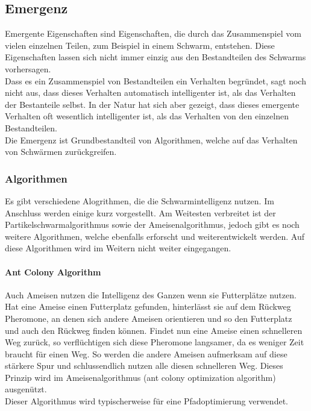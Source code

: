 		\subsection{Emergenz}
		Emergente Eigenschaften sind Eigenschaften, die durch das Zusammenspiel vom vielen einzelnen Teilen, zum Beispiel in einem Schwarm, entstehen. Diese Eigenschaften lassen sich nicht immer einzig aus den Bestandteilen des Schwarms vorhersagen. \\
		Dass es ein Zusammenspiel von Bestandteilen ein Verhalten begründet, sagt noch nicht aus, dass dieses Verhalten automatisch intelligenter ist, als das Verhalten der Bestanteile selbst. In der Natur hat sich aber gezeigt, dass dieses emergente Verhalten oft wesentlich intelligenter ist, als das Verhalten von den einzelnen Bestandteilen. \\
		Die Emergenz ist Grundbestandteil von Algorithmen, welche auf das Verhalten von Schwärmen zurückgreifen.\cite{melchior-bsc}
		
		
				
		\subsubsection{Algorithmen}
		Es gibt verschiedene Alogrithmen, die die Schwarmintelligenz nutzen. Im Anschluss werden einige kurz vorgestellt. Am Weitesten verbreitet ist der Partikelschwarmalgorithmus sowie der Ameisenalgorithmus, jedoch gibt es noch weitere Algorithmen, welche ebenfalls erforscht und weiterentwickelt werden. Auf diese Algorithmen wird im Weitern nicht weiter eingegangen.\cite{uulm}
		
		\paragraph{Ant Colony Algorithm}
		$\;$ \\
		Auch Ameisen nutzen die Intelligenz des Ganzen wenn sie Futterplätze nutzen. Hat eine Ameise einen Futterplatz gefunden, hinterlässt sie auf dem Rückweg Pheromone, an denen sich andere Ameisen orientieren und so den Futterplatz und auch den Rückweg finden können. Findet nun eine Ameise einen schnelleren Weg zurück, so verflüchtigen sich diese Pheromone langsamer, da es weniger Zeit braucht für einen Weg. So werden die andere Ameisen aufmerksam auf diese stärkere Spur und schlussendlich nutzen alle diesen schnelleren Weg. Dieses Prinzip wird im Ameisenalgorithmus (ant colony optimization algorithm) ausgenützt.\\Dieser Algorithmus wird typischerweise für eine Pfadoptimierung verwendet.
		
